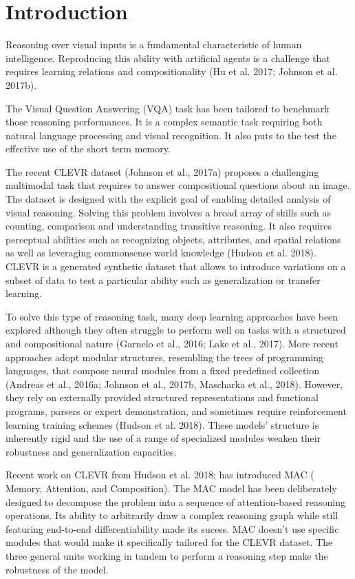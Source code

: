 \section{Introduction}
Reasoning over visual inputs is a fundamental characteristic of human intelligence.
Reproducing this ability with artificial agents is a challenge that requires learning relations and compositionality (Hu et al. 2017; Johnson et al. 2017b).

The Visual Question Answering (VQA) task has been tailored to benchmark those reasoning performances. It is a complex semantic task requiring both natural language processing and visual recognition. It also puts to the test the effective use of the short term memory.

The recent CLEVR dataset (Johnson et al., 2017a) proposes a challenging multimodal task that requires to answer compositional questions about an image. The dataset is designed with the explicit goal of enabling detailed analysis of visual reasoning.
Solving this problem involves a broad array of skills such as counting, comparison and understanding transitive reasoning.
It also requires perceptual abilities such as recognizing objects, attributes, and spatial relations as well as leveraging commonsense world knowledge (Hudson et al. 2018).
CLEVR is a generated synthetic dataset that allows to introduce variations on a subset of data to test a particular ability such as generalization or transfer learning.

To solve this type of reasoning task, many deep learning approaches have been explored although they often struggle to perform well on tasks with a structured and compositional nature (Garnelo et al., 2016; Lake et al., 2017). 
More recent approaches adopt modular structures, resembling the trees of programming languages, that compose neural modules from a fixed predefined collection (Andreas et al., 2016a; Johnson et al., 2017b, Mascharka et al., 2018). However, they rely on externally provided structured representations and functional programs, parsers or expert demonstration, and sometimes require reinforcement learning training schemes (Hudson et al. 2018). 
These models’ structure is inherently rigid and the use of a range of specialized modules weaken their robustness and generalization capacities.

Recent work on CLEVR from Hudson et al. 2018;  has introduced  MAC ( Memory, Attention, and Composition). The MAC model has been deliberately designed to decompose the problem into a sequence of attention-based reasoning operations. Its ability to arbitrarily draw a complex reasoning graph while still featuring end-to-end differentiability made its sucess.
MAC doesn’t use specific modules that would make it specifically tailored for the CLEVR dataset. The three general units working in tandem to perform a reasoning step make the robustness of the model.

